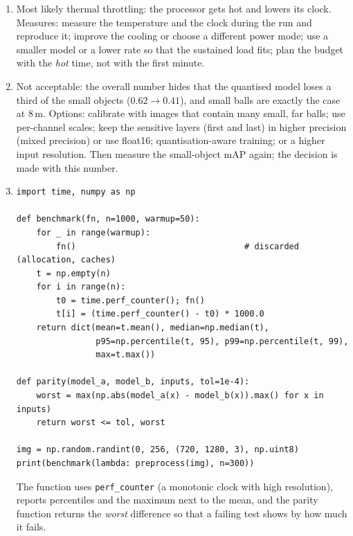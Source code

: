 \begin{enumerate}[label=\textbf{\ansnum.\arabic*}]
  \item Most likely thermal throttling: the processor gets hot and lowers its clock. Measures: measure the temperature and the clock during the run and reproduce it; improve the cooling or choose a different power mode; use a smaller model or a lower rate so that the sustained load fits; plan the budget with the \emph{hot} time, not with the first minute.
  \item Not acceptable: the overall number hides that the quantised model loses a third of the small objects ($0.62\to0.41$), and small balls are exactly the case at $8$\,m. Options: calibrate with images that contain many small, far balls; use per-channel scales; keep the sensitive layers (first and last) in higher precision (mixed precision) or use float16; quantisation-aware training; or a higher input resolution. Then measure the small-object mAP again; the decision is made with this number.
  \item[\textbf{\ansnum.10}$\star$]
\begin{verbatim}
import time, numpy as np

def benchmark(fn, n=1000, warmup=50):
    for _ in range(warmup):
        fn()                                  # discarded (allocation, caches)
    t = np.empty(n)
    for i in range(n):
        t0 = time.perf_counter(); fn()
        t[i] = (time.perf_counter() - t0) * 1000.0
    return dict(mean=t.mean(), median=np.median(t),
                p95=np.percentile(t, 95), p99=np.percentile(t, 99),
                max=t.max())

def parity(model_a, model_b, inputs, tol=1e-4):
    worst = max(np.abs(model_a(x) - model_b(x)).max() for x in inputs)
    return worst <= tol, worst

img = np.random.randint(0, 256, (720, 1280, 3), np.uint8)
print(benchmark(lambda: preprocess(img), n=300))
\end{verbatim}
The function uses \verb!perf_counter! (a monotonic clock with high resolution), reports percentiles and the maximum next to the mean, and the parity function returns the \emph{worst} difference so that a failing test shows by how much it fails.
\end{enumerate}
